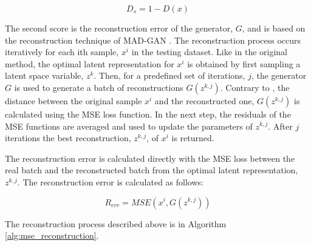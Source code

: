 \begin{equation}
    D_{s} = 1 - D(x)
\end{equation}

The second score is the reconstruction error of the generator, $G$, and is based on the reconstruction technique of MAD-GAN \cite{li.etal_MADGANMultivariateAnomaly_2019}. The reconstruction process occurs iteratively for each ith sample, $x^i$ in the testing dataset. Like in the original method, the optimal latent representation for $x^i$ is obtained by first sampling a latent space variable, $z^k$. Then, for a predefined set of iterations, $j$, the generator $G$ is used to generate a batch of reconstructions $G(z^{k,j})$. Contrary to \cite{li.etal_MADGANMultivariateAnomaly_2019}, the distance between the original sample $x^i$ and the reconstructed 
one, $G(z^{k,j})$ is calculated using the MSE loss function. In the next step, the residuals of the MSE functions are averaged and used to update the parameters of $z^{k,j}$. After $j$ iterations the best reconstruction, $z^{k,j}$, of $x^i$ is returned.

The reconstruction error is calculated directly with the MSE loss between the real batch and the reconstructed batch from the optimal latent representation, $z^{k,j}$. The reconstruction error is calculated as follows:

\begin{equation}
    R_{err} = MSE(x^i, G(z^{k,j}))
\end{equation}

The reconstruction process described above is in Algorithm \ref{alg:mse_reconstruction}.
\\

\noindent{}

